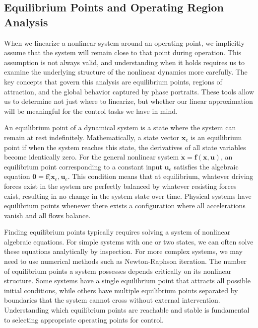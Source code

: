 \subsection{Equilibrium Points and Operating Region Analysis}

When we linearize a nonlinear system around an operating point, we implicitly assume that the system will remain close to that point during operation. This assumption is not always valid, and understanding when it holds requires us to examine the underlying structure of the nonlinear dynamics more carefully. The key concepts that govern this analysis are equilibrium points, regions of attraction, and the global behavior captured by phase portraits. These tools allow us to determine not just where to linearize, but whether our linear approximation will be meaningful for the control tasks we have in mind.

An equilibrium point of a dynamical system is a state where the system can remain at rest indefinitely. Mathematically, a state vector $\mathbf{x}_e$ is an equilibrium point if when the system reaches this state, the derivatives of all state variables become identically zero. For the general nonlinear system $\dot{\mathbf{x}} = \mathbf{f}(\mathbf{x}, \mathbf{u})$, an equilibrium point corresponding to a constant input $\mathbf{u}_e$ satisfies the algebraic equation $\mathbf{0} = \mathbf{f}(\mathbf{x}_e, \mathbf{u}_e$. This condition means that at equilibrium, whatever driving forces exist in the system are perfectly balanced by whatever resisting forces exist, resulting in no change in the system state over time. Physical systems have equilibrium points whenever there exists a configuration where all accelerations vanish and all flows balance.

Finding equilibrium points typically requires solving a system of nonlinear algebraic equations. For simple systems with one or two states, we can often solve these equations analytically by inspection. For more complex systems, we may need to use numerical methods such as Newton-Raphson iteration. The number of equilibrium points a system possesses depends critically on its nonlinear structure. Some systems have a single equilibrium point that attracts all possible initial conditions, while others have multiple equilibrium points separated by boundaries that the system cannot cross without external intervention. Understanding which equilibrium points are reachable and stable is fundamental to selecting appropriate operating points for control.

